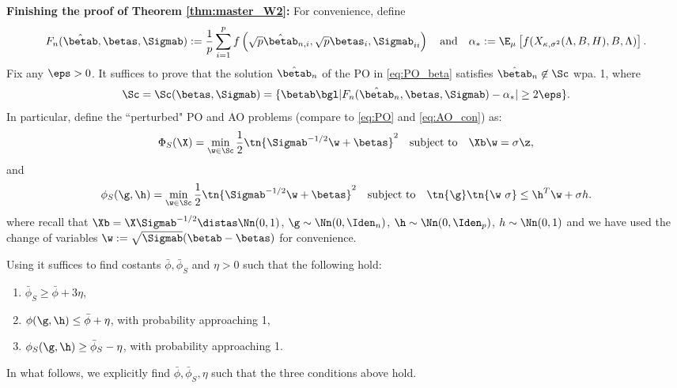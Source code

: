 



\noindent\textbf{Finishing the proof of Theorem \ref{thm:master_W2}:} For convenience, define 
$$F_n(\hat\betab,\betas,\Sigmab):=\frac{1}{p} \sum_{i=1}^{p} f\left(\sqrt{p}\hat\betab_{n,i},\sqrt{p}\betas_{i},\Sigmab_{ii}\right)\quad\text{and}\quad\alpha_*:=\E_\mu\left[f(X_{\kappa,\sigma^2}(\Lambda,B,H),B,\Lambda)\right].$$
Fix  any $\eps>0$. It suffices to prove that the solution $\hat\betab_n$ of the PO in \eqref{eq:PO_beta} satisfies $\hat\betab_n\not\in\Sc$ wpa. 1, where 
\begin{align}\label{eq:S_set}
\Sc = \Sc(\betas,\Sigmab) =\{\betab\bgl |F_n(\hat\betab_n,\betas,\Sigmab)-\alpha_*|\geq 2\eps\}.
\end{align}
In particular, define the ``perturbed" PO and AO problems (compare to \eqref{eq:PO} and \eqref{eq:AO_con}) as:
\begin{align}\label{eq:PO_S}
\Phi_S(\X)=\min_{\w\in\Sc} \frac{1}{2}\tn{\Sigmab^{-1/2}\w+\betas}^2\quad\text{subject to}\quad \Xb\w=\sigma \z,
\end{align}
and
\begin{align}
\phi_S(\g,\h)=\min_{\w\in\Sc} \frac{1}{2}\tn{\Sigmab^{-1/2}\w+\betas}^2\quad\text{subject to}\quad \tn{\g}\tn{\w~{\sigma}}\leq \h^T\w+\sigma h.\label{eq:AO_S}
\end{align}%
where recall that $\Xb=\X\Sigmab^{-1/2}\distas\Nn(0,1)$, $\g\sim\Nn(0,\Iden_n)$, $\h\sim\Nn(0,\Iden_p)$, $h\sim \Nn(0,1)$ and we have used the change of variables $\w:=\sqrt{\Sigmab}(\betab-\betas)$ for convenience. 

 Using \cite[Theorem 6.1(iii)]{thrampoulidis2018precise} it suffices to find costants $\bar\phi, \bar\phi_S$ and $\eta>0$ such that the following hold:
\begin{enumerate}
\item $\bar\phi_S \geq \bar\phi + 3\eta$,
\item $\phi(\g,\h) \leq \bar\phi + \eta$, with probability approaching 1,
\item $\phi_S(\g,\h) \geq \bar\phi_S - \eta$, with probability approaching 1.
\end{enumerate}
In what follows, we  explicitly find $\bar\phi, \bar\phi_S,\eta$ such that the three conditions above hold.

